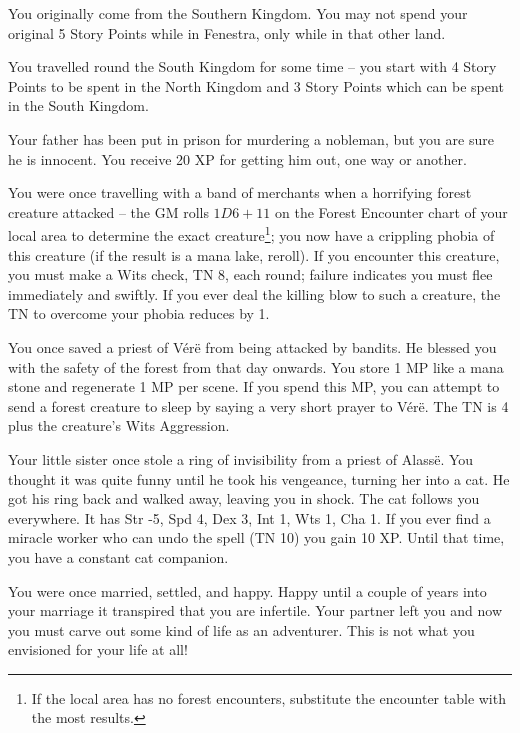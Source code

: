 \begin{list}{\addtocounter{list}{1}\textbf{:}}{\raggedleft}
\item{You originally come from the Southern Kingdom.  You may not spend your original 5 Story Points while in Fenestra, only while in that other land.}

\item{You travelled round the South Kingdom for some time -- you start with 4 Story Points to be spent in the North Kingdom and 3 Story Points which can be spent in the South Kingdom.}

\item{Your father has been put in prison for murdering a nobleman, but you are sure he is innocent.  You receive 20 XP for getting him out, one way or another.}

\item{You were once travelling with a band of merchants when a horrifying forest creature attacked -- the GM rolls $1D6+11$ on the Forest Encounter chart of your local area to determine the exact creature\footnote{If the local area has no forest encounters, substitute the encounter table with the most results.}; you now have a crippling phobia of this creature (if the result is a mana lake, reroll).  If you encounter this creature, you must make a Wits check, TN 8, each round; failure indicates you must flee immediately and swiftly.  If you ever deal the killing blow to such a creature, the TN to overcome your phobia reduces by 1.}

\item{You once saved a priest of V\'{e}r\"{e} from being attacked by bandits.  He blessed you with the safety of the forest from that day onwards.  You store 1 MP like a mana stone and regenerate 1 MP per scene.  If you spend this MP, you can attempt to send a forest creature to sleep by saying a very short prayer to V\'{e}r\"{e}.  The TN is 4 plus the creature's Wits  Aggression.}

\item{Your little sister once stole a ring of invisibility from a priest of Alass\"{e}.  You thought it was quite funny until he took his vengeance, turning her into a cat.  He got his ring back and walked away, leaving you in shock.  The cat follows you everywhere.  It has Str -5, Spd 4, Dex 3, Int 1, Wts 1, Cha 1.  If you ever find a miracle worker who can undo the spell (TN 10) you gain 10 XP.  Until that time, you have a constant cat companion.}

\item{You were once married, settled, and happy.  Happy until a couple of years into your marriage it transpired that you are infertile.  Your partner left you and now you must carve out some kind of life as an adventurer.  This is not what you envisioned for your life at all!}


\end{list}
